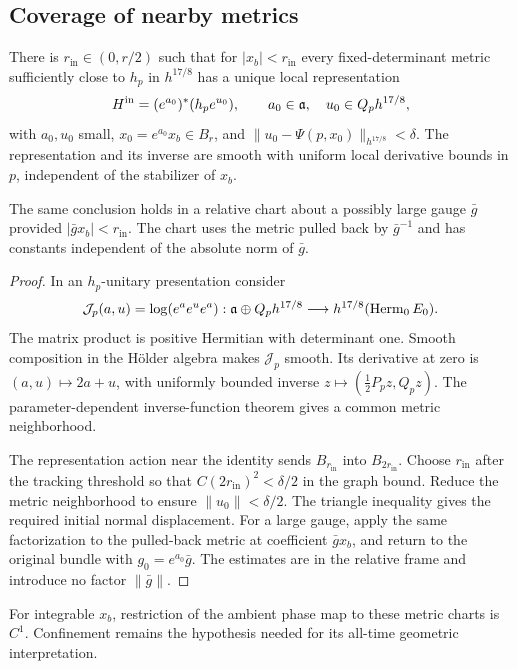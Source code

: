 \subsection{Coverage of nearby metrics}
\begin{proposition}\label{prop:metric-charts}
There is $r_{\mathrm{in}}\in(0,r/2)$ such that for
$|x_b|<r_{\mathrm{in}}$ every fixed-determinant
metric sufficiently close to $h_p$ in $h^{17/8}$
has a unique local representation
\begin{equation}\label{eq:metric-chart}
 H^{\mathrm{in}}=(e^{a_0})^*(h_pe^{u_0}),\qquad
 a_0\in\mathfrak a,\quad u_0\in Q_ph^{17/8},
\end{equation}
with $a_0,u_0$ small,
$x_0=e^{a_0}x_b\in B_r$, and
$\|u_0-\Psi(p,x_0)\|_{h^{17/8}}<\delta$.
The representation and its inverse are smooth with
uniform local derivative bounds in $p$, independent
of the stabilizer of $x_b$.

The same conclusion holds in a relative chart about
a possibly large gauge $\bar g$ provided
$|\bar g x_b|<r_{\mathrm{in}}$.
The chart uses the metric pulled back by $\bar g^{-1}$
and has constants independent of the absolute norm
of $\bar g$.
\end{proposition}

\begin{proof}
In an $h_p$-unitary presentation consider
\[
 \mathcal J_p(a,u)=\log(e^a e^u e^a):
 \mathfrak a\oplus Q_ph^{17/8}\longrightarrow h^{17/8}(\operatorname{Herm}_0E_0).
\]
The matrix product is positive Hermitian with
determinant one. Smooth composition in the H\"older
algebra makes $\mathcal J_p$ smooth. Its derivative
at zero is $(a,u)\mapsto2a+u$, with uniformly bounded
inverse $z\mapsto(\frac12P_pz,Q_pz)$.
The parameter-dependent inverse-function theorem
gives a common metric neighborhood.

The representation action near the identity sends
$B_{r_{\mathrm{in}}}$ into $B_{2r_{\mathrm{in}}}$.
Choose $r_{\mathrm{in}}$ after the tracking threshold
so that $C(2r_{\mathrm{in}})^2<\delta/2$ in the graph
bound. Reduce the metric neighborhood to ensure
$\|u_0\|<\delta/2$. The triangle inequality gives
the required initial normal displacement.
For a large gauge, apply the same factorization to
the pulled-back metric at coefficient $\bar g x_b$,
and return to the original bundle with
$g_0=e^{a_0}\bar g$. The estimates are in the relative
frame and introduce no factor $\|\bar g\|$.
\end{proof}

For integrable $x_b$, restriction of the ambient
phase map to these metric charts is $C^1$.
Confinement remains the hypothesis needed for its
all-time geometric interpretation.

